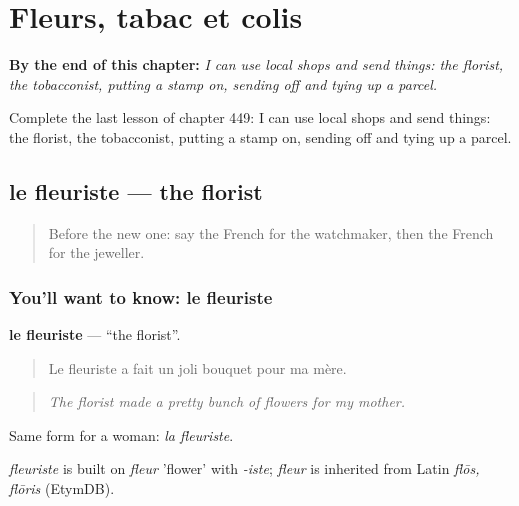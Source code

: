 
\chapter{Fleurs, tabac et colis}
\label{ch:fr-fleurs-tabac-et-colis}

\begin{chapteropening}
\textbf{By the end of this chapter:} \emph{I can use local shops and send things: the florist, the tobacconist, putting a stamp on, sending off and tying up a parcel.}

Complete the last lesson of chapter 449: I can use local shops and send things: the florist, the tobacconist, putting a stamp on, sending off and tying up a parcel.
\end{chapteropening}

\section[le fleuriste]{le fleuriste — the florist}

\label{lesson:FR-C449-fleuriste}



\begin{quote}
Before the new one: say the French for the watchmaker, then the French for the jeweller.
\end{quote}

\subsection*{You'll want to know: le fleuriste}
\textbf{le fleuriste} — \textquotedblleft{}the florist\textquotedblright{}.

\begin{quote}
Le fleuriste a fait un joli bouquet pour ma mère.
\end{quote}

\begin{quote}
\emph{The florist made a pretty bunch of flowers for my mother.}
\end{quote}

Same form for a woman: \emph{la fleuriste}.

\begin{cousinweb}
\emph{fleuriste} is built on \emph{fleur} 'flower' with \emph{-iste}; \emph{fleur} is inherited from Latin \emph{flōs, flōris} (EtymDB).
\end{cousinweb}

